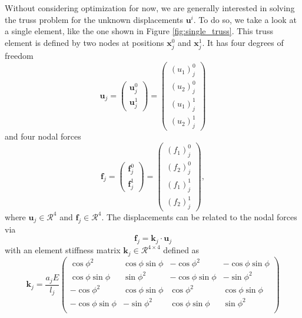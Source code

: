 Without considering optimization for now, we are generally interested in solving the truss problem for the unknown displacements $\mathbf{u}^i$. To do so, we take a look at a single element, like the one shown in Figure \ref{fig:single_truss}. This truss element is defined by two nodes at positions $\mathbf{x}^0_j$ and $\mathbf{x}^1_j$. It has four degrees of freedom 
\begin{equation}
    \mathbf{u}_j = 
    \begin{pmatrix}
        \mathbf{u}^0_j \\  \mathbf{u}^1_j
    \end{pmatrix}
    = 
    \begin{pmatrix}
        (u_1)^0_j \\ (u_2)^0_j \\  (u_1)^1_j \\ (u_2)^1_j
    \end{pmatrix}
\end{equation} 
and four nodal forces 
\begin{equation}
    \mathbf{f}_j = 
    \begin{pmatrix}
        \mathbf{f}^0_j \\  \mathbf{f}^1_j
    \end{pmatrix}
    = 
    \begin{pmatrix}
        (f_1)^0_j\\ (f_2)^0_j\\ (f_1)^1_j \\ (f_2)^1_j
    \end{pmatrix},
\end{equation} 
where $\mathbf{u}_j \in \mathcal{R}^4$ and $\mathbf{f}_j \in \mathcal{R}^4$. 
The displacements can be related to the nodal forces via 
\begin{equation}
    \mathbf{f}_j = \mathbf{k}_j \cdot \mathbf{u}_j
\end{equation}
with an element stiffness matrix $\mathbf{k}_j \in \mathcal{R}^{4\times4}$ defined as \cite{Christensen2008}
\begin{equation}
    \mathbf{k}_j = \frac{a_j E}{l_j}
    \begin{pmatrix}
    \cos{\phi}^2 & \cos{\phi}\sin{\phi} & -\cos{\phi}^2 & -\cos{\phi}\sin{\phi} \\
    \cos{\phi}\sin{\phi} & \sin{\phi}^2 & -\cos{\phi}\sin{\phi} & -\sin{\phi}^2 \\
    -\cos{\phi}^2 & \cos{\phi}\sin{\phi} & \cos{\phi}^2 &\cos{\phi}\sin{\phi} \\
    -\cos{\phi}\sin{\phi} & -\sin{\phi}^2 & \cos{\phi}\sin{\phi} & \sin{\phi}^2 \\
    \end{pmatrix}
\end{equation}
